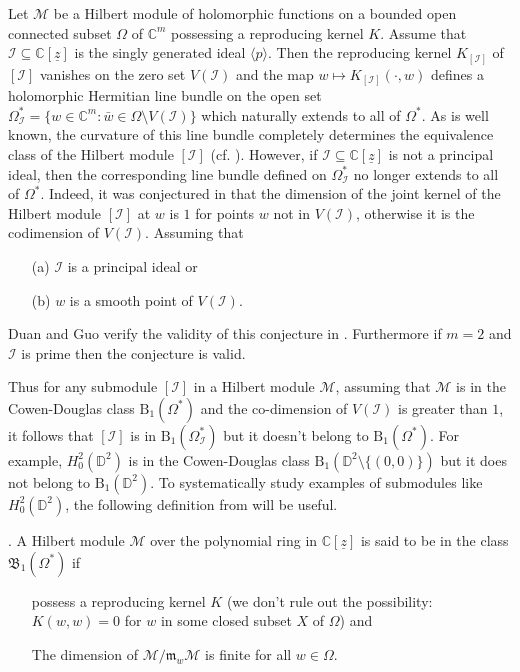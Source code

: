 \documentclass[11pt]{amsart}
\theoremstyle{definition}
\numberwithin{equation}{section}
\begin{document}
Let $\mathcal M$ be a Hilbert module of holomorphic functions on a bounded open connected subset $\Omega$ of $\mathbb C^m$ possessing a reproducing kernel $K$.  Assume that $\mathcal I \subseteq \mathbb C[\underline{z}]$ is the singly generated ideal $\langle p \rangle$.
Then the reproducing kernel $K_{[\mathcal I]}$ of $[\mathcal I]$  vanishes on the zero set $V(\mathcal I)$
and the map $w \mapsto K_{[\mathcal I]}(\cdot , w)$  defines a holomorphic Hermitian line bundle on the open set $\Omega_\mathcal I^*=\{w\in \mathbb C^m: \bar{w} \in \Omega\setminus V(\mathcal I)\}$
which naturally extends to all of $\Omega^*$.
As is well known, the curvature of this line bundle completely determines the equivalence class of the Hilbert module $[\mathcal I]$ (cf. \cite{cd, cd1}). However, if $\mathcal I\subseteq \mathbb C[\underline{z}]$ is not a principal ideal, then the corresponding line bundle defined on $\Omega_\mathcal I^*$  no longer extends to all of $\Omega^*$.    Indeed, it was conjectured in \cite{dmv} that  the  dimension of the joint kernel of the Hilbert module $[\mathcal I]$ at $w$ is $1$ for points $w$ not in $V(\mathcal I)$,
otherwise it is the codimension of $V(\mathcal I)$. Assuming that
\begin{enumerate}
\item[(a)] $\mathcal I$ is a principal ideal or
\item[(b)] $w$ is a smooth point of $V(\mathcal I)$.
\end{enumerate}
Duan and Guo verify the validity of this conjecture in \cite{dg}.
Furthermore if $m=2$ and $\mathcal I$ is prime then
the conjecture is valid.

Thus for any submodule $[\mathcal I]$ in a Hilbert module
$\mathcal M$, assuming that $\mathcal M$ is in the Cowen-Douglas class $\mathrm B_1(\Omega^*)$ and the co-dimension of  $V(\mathcal I) $ is greater than $1$, it follows that $[\mathcal I]$ is in $\mathrm B_1(\Omega_\mathcal I^*)$ but it doesn't belong to $\mathrm B_1(\Omega^*)$.  For example, $H_0^2(\mathbb D^2)$ is in the Cowen-Douglas class
$\mathrm B_1(\mathbb D^2\setminus \{(0,0)\})$ but it does not belong to $\mathrm B_1(\mathbb D^2)$.  To systematically study examples of submodules like $H^2_0(\mathbb D^2)$, the following definition from \cite{bmp} will be useful.

.
A Hilbert module $\mathcal M$ over the
polynomial ring in ${{\mathbb C}}[\underline z]$  is said to be in the class
$\mathfrak{B}_1(\Omega^*)$ if
\begin{enumerate}
\item[\sf{(rk)}] possess a reproducing kernel $K$
(we don't rule out the possibility: $K(w,w)=0$ for  $w$ in
some closed subset $X$ of $\Omega$) and \item[\sf{(fin)}] The
dimension of $\mathcal M/\mathfrak m_w\mathcal M$ is finite for all
$w\in \Omega$.
\end{enumerate}
\end{document}
